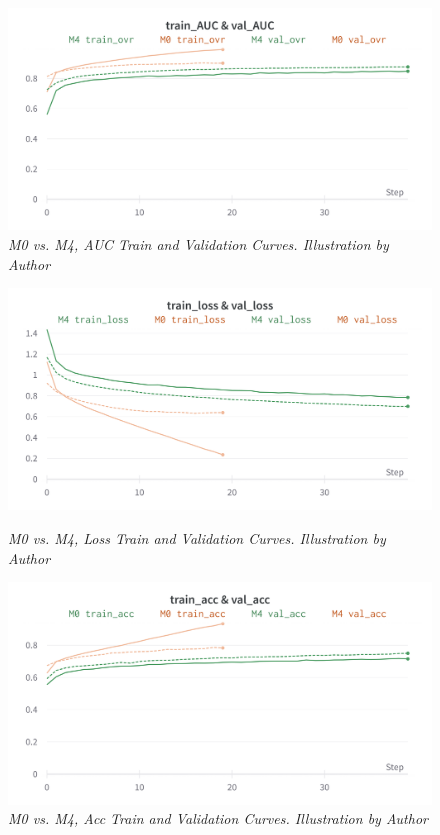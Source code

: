 \begin{figure}[H]
  \centering
  \includegraphics[width=\textwidth]{imatges/results/AUCM0M4.png}
  \caption[M0 vs. M4, AUC Train and Validation Curves]{\textit{M0 vs. M4, AUC Train and Validation Curves. Illustration by Author}}
\end{figure}

\newpage

\begin{figure}[H]
  \centering
  \includegraphics[width=\textwidth]{imatges/results/LossM0M4.png}
  \caption[M0 vs. M4, Loss Train and Validation Curves]{\textit{M0 vs. M4, Loss Train and Validation Curves. Illustration by Author}}
  {\label{fig:lossm0m4}}
\end{figure}

\begin{figure}[H]
  \centering
  \includegraphics[width=\textwidth]{imatges/results/AccM0M4.png}
  \caption[M0 vs. M4, Acc Train and Validation Curves]{\textit{M0 vs. M4, Acc Train and Validation Curves. Illustration by Author}}
\end{figure}

